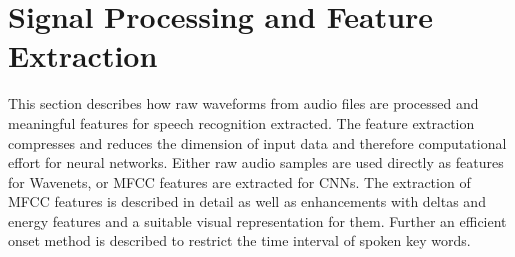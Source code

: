 
\chapter{Signal Processing and Feature Extraction}\label{sec:signal}
\thesisStateNew
This section describes how raw waveforms from audio files are processed and meaningful features for speech recognition extracted.
The feature extraction compresses and reduces the dimension of input data and therefore computational effort for neural networks.
Either raw audio samples are used directly as features for Wavenets, or MFCC features are extracted for CNNs.
The extraction of MFCC features is described in detail as well as enhancements with deltas and energy features and a suitable visual representation for them.
Further an efficient onset method is described to restrict the time interval of spoken key words. 





